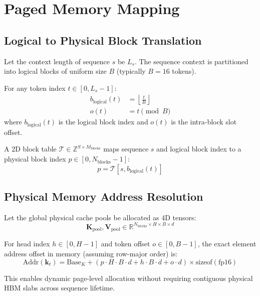 \documentclass[11pt,a4paper]{article}
\begin{document}
\section{Paged Memory Mapping}

\subsection{Logical to Physical Block Translation}

Let the context length of sequence $s$ be $L_s$. The sequence context is partitioned into logical blocks of uniform size $B$ (typically $B=16$ tokens).

For any token index $t \in [0, L_s - 1]$:
\begin{align}
b_{\text{logical}}(t) &= \left\lfloor \frac{t}{B} \right\rfloor \\
o(t) &= t \pmod B
\end{align}
where $b_{\text{logical}}(t)$ is the logical block index and $o(t)$ is the intra-block slot offset.

A 2D block table $\mathcal{T} \in \mathbb{Z}^{S \times M_{\text{blocks}}}$ maps sequence $s$ and logical block index to a physical block index $p \in [0, N_{\text{blocks}} - 1]$:
\begin{equation}
p = \mathcal{T}[s, b_{\text{logical}}(t)]
\end{equation}

\subsection{Physical Memory Address Resolution}

Let the global physical cache pools be allocated as 4D tensors:
\begin{equation}
\mathbf{K}_{\text{pool}}, \mathbf{V}_{\text{pool}} \in \mathbb{R}^{N_{\text{blocks}} \times H \times B \times d}
\end{equation}

For head index $h \in [0, H-1]$ and token offset $o \in [0, B-1]$, the exact element address offset in memory (assuming row-major order) is:
\begin{equation}
\text{Addr}(\mathbf{k}_t) = \text{Base}_K + \left( p \cdot H \cdot B \cdot d + h \cdot B \cdot d + o \cdot d \right) \times \text{sizeof}(\text{fp16})
\end{equation}

This enables dynamic page-level allocation without requiring contiguous physical HBM slabs across sequence lifetime.
\end{document}
